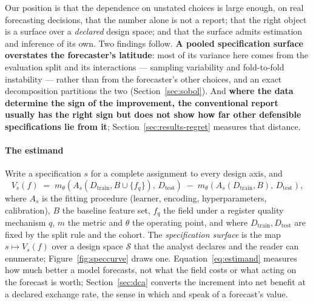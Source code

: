 \documentclass[11pt,3p,review,authoryear]{elsarticle}
\theoremstyle{definition}
\begin{document}
Our position is that the dependence on unstated choices is large enough, on
real forecasting decisions, that the number alone is not a report; that the
right object is a surface over a \emph{declared} design space; and that the
surface admits estimation and inference of its own. Two findings follow.
\textbf{A pooled specification surface overstates the forecaster's
latitude}: most of its variance here comes from the evaluation split and its
interactions --- sampling variability and fold-to-fold instability ---
rather than from the forecaster's other choices, and an exact decomposition
partitions the two
(Section~\ref{sec:sobol}). And \textbf{where the data determine the sign of
the improvement, the conventional report usually has the right sign but does
not show how far other defensible specifications lie from it};
Section~\ref{sec:results-regret} measures that distance.

\paragraph{The estimand}
Write a specification $s$ for a complete assignment to every design axis, and
\begin{equation}
V_s(f) \;=\; m_\theta\!\left(A_s(D_{\mathrm{train}}, B \cup \{f_q\}),\,
D_{\mathrm{test}}\right)
\;-\;
m_\theta\!\left(A_s(D_{\mathrm{train}}, B),\, D_{\mathrm{test}}\right),
\label{eq:estimand}
\end{equation}
where $A_s$ is the fitting procedure (learner, encoding, hyperparameters,
calibration), $B$ the baseline feature set, $f_q$ the field under a register
quality mechanism $q$, $m$ the metric and $\theta$ the operating point, and
where $D_{\mathrm{train}}, D_{\mathrm{test}}$ are fixed by the split rule and
the cohort. The \emph{specification surface} is the map
$s \mapsto V_s(f)$ over a design space $\mathcal{S}$ that the analyst declares
and the reader can enumerate; Figure~\ref{fig:speccurve} draws one.
Equation~\eqref{eq:estimand} measures how much better a model forecasts, not what the
field costs or what acting on the forecast is worth; Section~\ref{sec:dca}
converts the increment into net benefit at a declared exchange rate, the
sense in which \citet{murphy1993good} and \citet{granger2000economic} speak of
a forecast's value.
\end{document}
